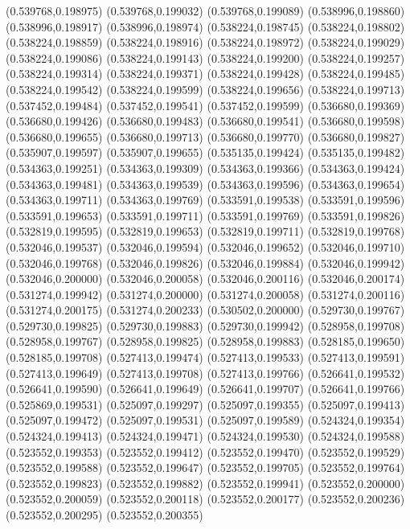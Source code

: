 (0.539768,0.198975)
(0.539768,0.199032)
(0.539768,0.199089)
(0.538996,0.198860)
(0.538996,0.198917)
(0.538996,0.198974)
(0.538224,0.198745)
(0.538224,0.198802)
(0.538224,0.198859)
(0.538224,0.198916)
(0.538224,0.198972)
(0.538224,0.199029)
(0.538224,0.199086)
(0.538224,0.199143)
(0.538224,0.199200)
(0.538224,0.199257)
(0.538224,0.199314)
(0.538224,0.199371)
(0.538224,0.199428)
(0.538224,0.199485)
(0.538224,0.199542)
(0.538224,0.199599)
(0.538224,0.199656)
(0.538224,0.199713)
(0.537452,0.199484)
(0.537452,0.199541)
(0.537452,0.199599)
(0.536680,0.199369)
(0.536680,0.199426)
(0.536680,0.199483)
(0.536680,0.199541)
(0.536680,0.199598)
(0.536680,0.199655)
(0.536680,0.199713)
(0.536680,0.199770)
(0.536680,0.199827)
(0.535907,0.199597)
(0.535907,0.199655)
(0.535135,0.199424)
(0.535135,0.199482)
(0.534363,0.199251)
(0.534363,0.199309)
(0.534363,0.199366)
(0.534363,0.199424)
(0.534363,0.199481)
(0.534363,0.199539)
(0.534363,0.199596)
(0.534363,0.199654)
(0.534363,0.199711)
(0.534363,0.199769)
(0.533591,0.199538)
(0.533591,0.199596)
(0.533591,0.199653)
(0.533591,0.199711)
(0.533591,0.199769)
(0.533591,0.199826)
(0.532819,0.199595)
(0.532819,0.199653)
(0.532819,0.199711)
(0.532819,0.199768)
(0.532046,0.199537)
(0.532046,0.199594)
(0.532046,0.199652)
(0.532046,0.199710)
(0.532046,0.199768)
(0.532046,0.199826)
(0.532046,0.199884)
(0.532046,0.199942)
(0.532046,0.200000)
(0.532046,0.200058)
(0.532046,0.200116)
(0.532046,0.200174)
(0.531274,0.199942)
(0.531274,0.200000)
(0.531274,0.200058)
(0.531274,0.200116)
(0.531274,0.200175)
(0.531274,0.200233)
(0.530502,0.200000)
(0.529730,0.199767)
(0.529730,0.199825)
(0.529730,0.199883)
(0.529730,0.199942)
(0.528958,0.199708)
(0.528958,0.199767)
(0.528958,0.199825)
(0.528958,0.199883)
(0.528185,0.199650)
(0.528185,0.199708)
(0.527413,0.199474)
(0.527413,0.199533)
(0.527413,0.199591)
(0.527413,0.199649)
(0.527413,0.199708)
(0.527413,0.199766)
(0.526641,0.199532)
(0.526641,0.199590)
(0.526641,0.199649)
(0.526641,0.199707)
(0.526641,0.199766)
(0.525869,0.199531)
(0.525097,0.199297)
(0.525097,0.199355)
(0.525097,0.199413)
(0.525097,0.199472)
(0.525097,0.199531)
(0.525097,0.199589)
(0.524324,0.199354)
(0.524324,0.199413)
(0.524324,0.199471)
(0.524324,0.199530)
(0.524324,0.199588)
(0.523552,0.199353)
(0.523552,0.199412)
(0.523552,0.199470)
(0.523552,0.199529)
(0.523552,0.199588)
(0.523552,0.199647)
(0.523552,0.199705)
(0.523552,0.199764)
(0.523552,0.199823)
(0.523552,0.199882)
(0.523552,0.199941)
(0.523552,0.200000)
(0.523552,0.200059)
(0.523552,0.200118)
(0.523552,0.200177)
(0.523552,0.200236)
(0.523552,0.200295)
(0.523552,0.200355)
